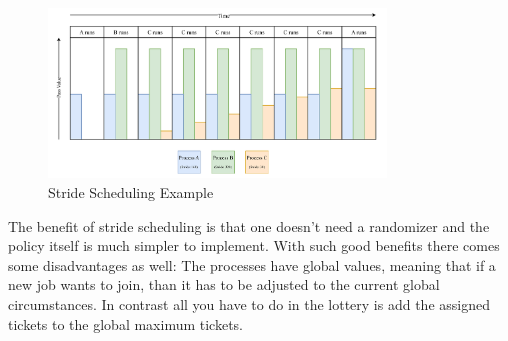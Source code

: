 \begin{figure}[h]
    \centering
    \includegraphics[width=0.8\textwidth]{Assets/Stride-Scheduling.pdf}
    \caption{Stride Scheduling Example}
    \label{fig:stride-scheduling}
\end{figure}

The benefit of stride scheduling is that one doesn't need a randomizer and the policy itself is much simpler to implement. With such good benefits there comes some disadvantages as well: The processes have global values, meaning that if a new job wants to join, than it has to be adjusted to the current global circumstances. In contrast all you have to do in the lottery is add the assigned tickets to the global maximum tickets.

